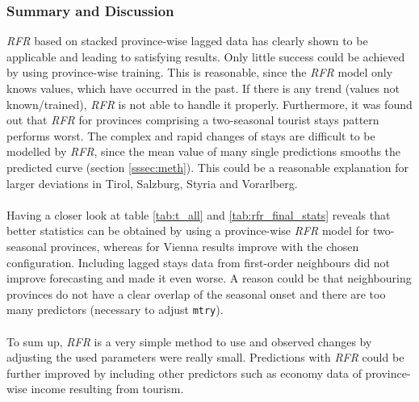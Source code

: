 \documentclass[a4paper,reqno,]{article}
\begin{document}
\subsubsection{Summary and Discussion}
\label{sssec:rfr_disc}
\textit{RFR} based on stacked province-wise lagged data has clearly shown to be applicable and leading to satisfying results. Only little success could be achieved by using province-wise training. This is reasonable, since the \textit{RFR} model only knows values, which have occurred in the past.  If there is any trend (values not known/trained), \textit{RFR} is not able to handle it properly. Furthermore, it was found out that \textit{RFR} for provinces comprising a two-seasonal tourist stays pattern performs worst. The complex and rapid changes of stays are difficult to be modelled by \textit{RFR}, since the mean value of many single predictions smooths the predicted curve (section \ref{sssec:meth}). This could be a reasonable explanation for larger deviations in Tirol, Salzburg, Styria and Vorarlberg.   
\\
\\
Having a closer look at table \ref{tab:t_all} and \ref{tab:rfr_final_stats} reveals that better statistics can be obtained by using a province-wise \textit{RFR} model for two-seasonal provinces, whereas for Vienna results improve with the chosen configuration. Including lagged stays data from first-order neighbours did not improve forecasting and made it even worse. A reason could be that neighbouring provinces do not have a clear overlap of the seasonal onset and there are too many predictors (necessary to adjust \texttt{mtry}).   
\\
\\
To sum up, \textit{RFR} is a very simple method to use and observed changes by adjusting the used parameters were really small. %
Predictions with \textit{RFR} could be further improved by including other predictors such as economy data of province-wise income resulting from tourism.
\newpage
\end{document}
